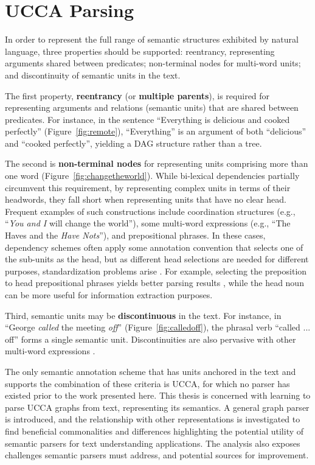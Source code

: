 \documentclass[12pt,a4paper,table]{report}
\begin{document}
\section{UCCA Parsing}\label{sec:intro_ucca_parsing}

In order to represent the full range of semantic structures exhibited by
natural language, three properties should be supported: reentrancy,
representing arguments shared between predicates;
non-terminal nodes for multi-word units;
and discontinuity of semantic units in the text.

The first property, \textbf{reentrancy} (or \textbf{multiple parents}), is required for
representing arguments and relations (semantic units) that are shared between predicates.
For instance, in the sentence
``Everything is delicious and cooked perfectly'' (Figure~\ref{fig:remote}),
``Everything'' is an argument of both ``delicious''
and ``cooked perfectly'', yielding a DAG structure rather than a tree.

The second is \textbf{non-terminal nodes} for representing units
comprising more than one word (Figure~\ref{fig:changetheworld}).
While bi-lexical dependencies partially circumvent this requirement, by
representing complex units in terms of their headwords, they fall short
when representing units that have no clear head.
Frequent examples of such constructions include
coordination structures (e.g., ``\textit{You and I} will change the world''),
some multi-word expressions (e.g., ``The Haves and the \textit{Have Nots}''),
and prepositional phrases.
In these cases, dependency schemes often apply some annotation convention that
selects one of the sub-units
as the head, but as different head selections are needed for different purposes,
standardization problems arise \citep{Ivanova2012who}.
For example, selecting the preposition to head prepositional phrases yields better
parsing results \citep{Schwartz:12}, while the head noun can be more useful for
information extraction purposes.

Third, semantic units may be \textbf{discontinuous} in the text. For instance, in
``George \textit{called} the meeting \textit{off}'' (Figure~\ref{fig:calledoff}),
the phrasal verb ``called ... off'' forms a single semantic unit.
Discontinuities are also pervasive with other multi-word
expressions \citep{schneider2014discriminative}.

The only semantic annotation scheme that has units anchored in the text and supports the combination of these criteria is UCCA,
for which no parser has existed prior to the work presented here.
This thesis is concerned with learning to parse UCCA graphs from text, representing its semantics.
A general graph parser is introduced,
and the relationship with other representations is investigated to find beneficial commonalities and
differences highlighting the potential utility of semantic parsers for text understanding applications.
The analysis also exposes challenges semantic parsers must address,
and potential sources for improvement.
\end{document}
